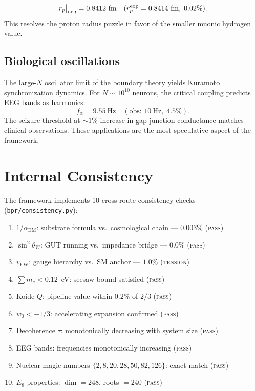 \documentclass[aps,prd,twocolumn,superscriptaddress,longbibliography,nofootinbib]{revtex4-2}
\newcommand{\vEW}{v_{\mathrm{EW}}}
\newcommand{\sinW}{\sin^2\!\theta_W}
\newcommand{\alphaEM}{\alpha_{\mathrm{EM}}}
\newcommand{\bpr}{\textsc{bpr}}
\begin{document}
\begin{equation}
r_p\big|_{\bpr} = 0.8412~\text{fm}
\quad (r_p^{\text{exp}} = 0.8414~\text{fm},\; 0.02\%).
\end{equation}
This resolves the proton radius puzzle in favor of the smaller muonic
hydrogen value.

\subsection{Biological oscillations}

The large-$N$ oscillator limit of the boundary theory yields Kuramoto
synchronization dynamics.  For $N \sim 10^{10}$ neurons, the critical
coupling predicts EEG bands as harmonics:
\begin{equation}
f_\alpha = 9.55~\text{Hz} \quad (\text{obs: }10~\text{Hz},\; 4.5\%).
\end{equation}
The seizure threshold at $\sim 1\%$ increase in gap-junction conductance
matches clinical observations.  These applications are the most speculative
aspect of the framework.


\section{Internal Consistency}
\label{sec:consistency}

The framework implements 10 cross-route consistency checks
(\texttt{bpr/consistency.py}):

\begin{enumerate}
\item $1/\alphaEM$: substrate formula vs.\ cosmological chain --- $0.003\%$
  (\textsc{pass})
\item $\sinW$: GUT running vs.\ impedance bridge --- $0.0\%$ (\textsc{pass})
\item $\vEW$: gauge hierarchy vs.\ SM anchor --- $1.0\%$ (\textsc{tension})
\item $\sum m_\nu < 0.12$~eV: seesaw bound satisfied (\textsc{pass})
\item Koide $Q$: pipeline value within $0.2\%$ of $2/3$ (\textsc{pass})
\item $w_0 < -1/3$: accelerating expansion confirmed (\textsc{pass})
\item Decoherence $\tau$: monotonically decreasing with system size
  (\textsc{pass})
\item EEG bands: frequencies monotonically increasing (\textsc{pass})
\item Nuclear magic numbers $\{2,8,20,28,50,82,126\}$: exact match
  (\textsc{pass})
\item $E_8$ properties: $\dim = 248$, roots $= 240$ (\textsc{pass})
\end{enumerate}
\end{document}
